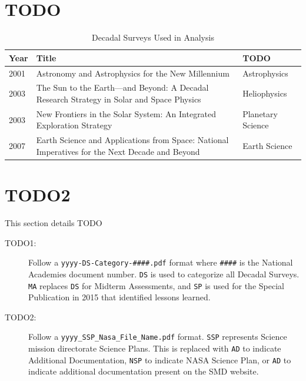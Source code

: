 \documentclass[preprint,12pt]{elsarticle}
\begin{document}
\section{TODO}
\label{TODO}

\begin{table}[H]
\centering
\begin{tabular}{p{1.2cm} p{7.5cm} p{3.5cm}}
 \hline
 \rowcolor[gray]{0.95}
 \textbf{Year} & \textbf{Title} & \textbf{TODO} \\ \hline
 2001 & Astronomy and Astrophysics for the New Millennium & Astrophysics \\
 \rowcolor[gray]{0.97}
 2003 & The Sun to the Earth—and Beyond: A Decadal Research Strategy in Solar and Space Physics & Heliophysics \\
 2003 & New Frontiers in the Solar System: An Integrated Exploration Strategy & Planetary  Science \\
 \rowcolor[gray]{0.97}
 2007 & Earth Science and Applications from Space: National Imperatives for the Next Decade and Beyond & Earth Science \\
\end{tabular}
\caption{Decadal Surveys Used in Analysis \cite{Academies_decadal}}\label{tab:Decadals_used}
\end{table}

\section{TODO2}
\label{TODO2}
This section details TODO

\begin{description}
 \item[TODO1:] Follow a \texttt{yyyy-DS-Category-\#\#\#\#.pdf} format where \texttt{\#\#\#\#} is the National Academies document number. \texttt{DS} is used to categorize all Decadal Surveys. \texttt{MA} replaces \texttt{DS} for Midterm Assessments, and \texttt{SP} is used for the Special Publication in 2015 that identified lessons learned.
 
 \item[TODO2:] Follow a \texttt{yyyy\_SSP\_Nasa\_File\_Name.pdf} format. \texttt{SSP} represents Science mission directorate Science Plans. This is replaced with \texttt{AD} to indicate Additional Documentation, \texttt{NSP} to indicate NASA Science Plan, or \texttt{AD} to indicate additional documentation present on the SMD website.
\end{description} 


 

\end{document}
